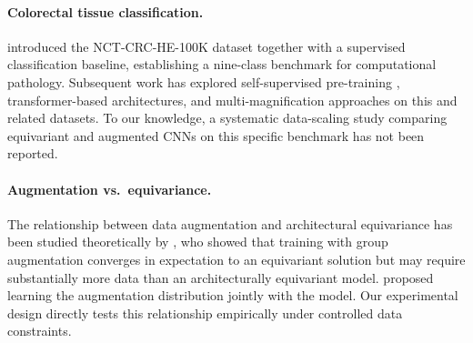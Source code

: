 \paragraph{Colorectal tissue classification.}
\citet{kather2018100} introduced the NCT-CRC-HE-100K dataset together with a supervised
classification baseline, establishing a nine-class benchmark for computational pathology.
Subsequent work has explored self-supervised pre-training \citep{ciga2022self}, transformer-based
architectures, and multi-magnification approaches on this and related datasets. To our
knowledge, a systematic data-scaling study comparing equivariant and augmented CNNs on
this specific benchmark has not been reported.

\paragraph{Augmentation vs.\ equivariance.}
The relationship between data augmentation and architectural equivariance has been
studied theoretically by \citet{chen2020group}, who showed that training with group
augmentation converges in expectation to an equivariant solution but may require
substantially more data than an architecturally equivariant model. \citet{benton2020learning}
proposed learning the augmentation distribution jointly with the model. Our experimental
design directly tests this relationship empirically under controlled data constraints.